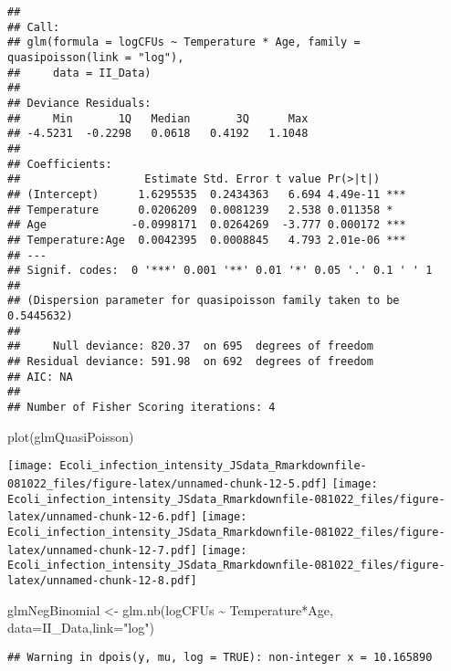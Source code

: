 \documentclass[
]{article}
\newenvironment{Shaded}{\begin{snugshade}}{\end{snugshade}}
\newcommand{\AttributeTok}[1]{\textcolor[rgb]{0.77,0.63,0.00}{#1}}
\newcommand{\FunctionTok}[1]{\textcolor[rgb]{0.00,0.00,0.00}{#1}}
\newcommand{\NormalTok}[1]{#1}
\newcommand{\OtherTok}[1]{\textcolor[rgb]{0.56,0.35,0.01}{#1}}
\newcommand{\SpecialCharTok}[1]{\textcolor[rgb]{0.00,0.00,0.00}{#1}}
\newcommand{\StringTok}[1]{\textcolor[rgb]{0.31,0.60,0.02}{#1}}
\begin{document}
\begin{verbatim}
## 
## Call:
## glm(formula = logCFUs ~ Temperature * Age, family = quasipoisson(link = "log"), 
##     data = II_Data)
## 
## Deviance Residuals: 
##     Min       1Q   Median       3Q      Max  
## -4.5231  -0.2298   0.0618   0.4192   1.1048  
## 
## Coefficients:
##                   Estimate Std. Error t value Pr(>|t|)    
## (Intercept)      1.6295535  0.2434363   6.694 4.49e-11 ***
## Temperature      0.0206209  0.0081239   2.538 0.011358 *  
## Age             -0.0998171  0.0264269  -3.777 0.000172 ***
## Temperature:Age  0.0042395  0.0008845   4.793 2.01e-06 ***
## ---
## Signif. codes:  0 '***' 0.001 '**' 0.01 '*' 0.05 '.' 0.1 ' ' 1
## 
## (Dispersion parameter for quasipoisson family taken to be 0.5445632)
## 
##     Null deviance: 820.37  on 695  degrees of freedom
## Residual deviance: 591.98  on 692  degrees of freedom
## AIC: NA
## 
## Number of Fisher Scoring iterations: 4
\end{verbatim}

\begin{Shaded}
\begin{Highlighting}[]
\FunctionTok{plot}\NormalTok{(glmQuasiPoisson)}
\end{Highlighting}
\end{Shaded}

\texttt{[image: Ecoli\_infection\_intensity\_JSdata\_Rmarkdownfile-081022\_files/figure-latex/unnamed-chunk-12-5.pdf]}
\texttt{[image: Ecoli\_infection\_intensity\_JSdata\_Rmarkdownfile-081022\_files/figure-latex/unnamed-chunk-12-6.pdf]}
\texttt{[image: Ecoli\_infection\_intensity\_JSdata\_Rmarkdownfile-081022\_files/figure-latex/unnamed-chunk-12-7.pdf]}
\texttt{[image: Ecoli\_infection\_intensity\_JSdata\_Rmarkdownfile-081022\_files/figure-latex/unnamed-chunk-12-8.pdf]}

\begin{Shaded}
\begin{Highlighting}[]
\NormalTok{glmNegBinomial }\OtherTok{\textless{}{-}} \FunctionTok{glm.nb}\NormalTok{(logCFUs }\SpecialCharTok{\textasciitilde{}}\NormalTok{ Temperature}\SpecialCharTok{*}\NormalTok{Age, }\AttributeTok{data=}\NormalTok{II\_Data,}\AttributeTok{link=}\StringTok{"log"}\NormalTok{)}
\end{Highlighting}
\end{Shaded}

\begin{verbatim}
## Warning in dpois(y, mu, log = TRUE): non-integer x = 10.165890
\end{verbatim}
\end{document}
